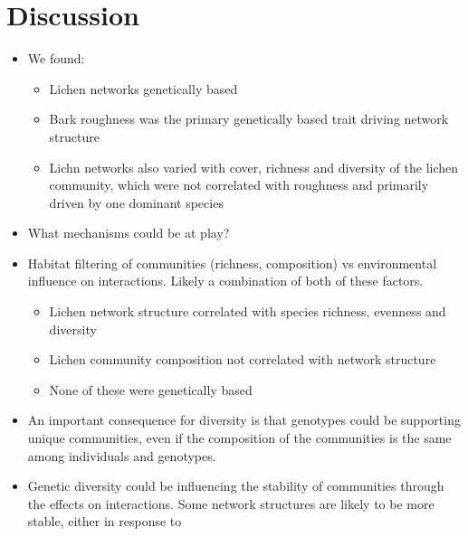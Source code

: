 \documentclass[11pt,twocolumn,twoside,lineno]{pnas-new}
\begin{document}


\section*{Discussion}


\begin{itemize}
\item We found:
  \begin{itemize}
  \item Lichen networks genetically based
  \item Bark roughness was the primary genetically based trait driving
    network structure
  \item Lichn networks also varied with cover, richness and diversity
    of the lichen community, which were not correlated with roughness
    and primarily driven by one dominant species
  \end{itemize}
\item What mechanisms could be at play?
\item Habitat filtering of communities (richness, composition) vs
  environmental influence on interactions. Likely a combination of
  both of these factors.
  \begin{itemize}
  \item Lichen network structure correlated with species richness,
    evenness and diversity
  \item Lichen community composition not correlated with network
    structure
  \item None of these were genetically based
  \end{itemize}
\item An important consequence for diversity is that genotypes could
  be supporting unique communities, even if the composition of the
  communities is the same among individuals and genotypes.
\item Genetic diversity could be influencing the stability of
  communities through the effects on interactions. Some network
  structures are likely to be more stable, either in response to

\end{itemize}
\end{document}
